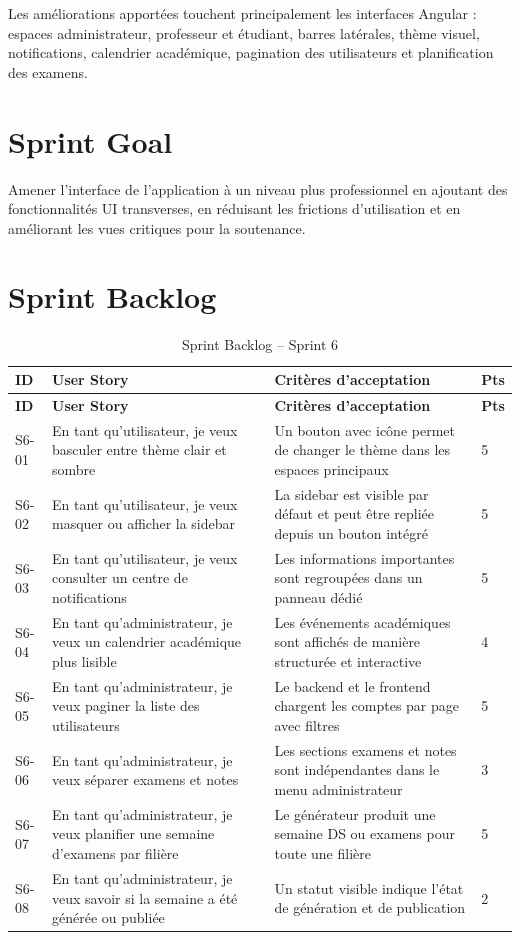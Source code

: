 \documentclass[12pt,a4paper]{report}
\begin{document}
Les améliorations apportées touchent principalement les interfaces Angular : espaces administrateur, professeur et étudiant, barres latérales, thème visuel, notifications, calendrier académique, pagination des utilisateurs et planification des examens.

\section{Sprint Goal}

Amener l'interface de l'application à un niveau plus professionnel en ajoutant des fonctionnalités UI transverses, en réduisant les frictions d'utilisation et en améliorant les vues critiques pour la soutenance.

\section{Sprint Backlog}

\begin{longtable}{|p{1.6cm}|p{6cm}|p{5.6cm}|p{1.4cm}|}
\caption{Sprint Backlog -- Sprint 6}\\
\hline
\textbf{ID} & \textbf{User Story} & \textbf{Critères d'acceptation} & \textbf{Pts} \\
\hline
\endfirsthead
\hline
\textbf{ID} & \textbf{User Story} & \textbf{Critères d'acceptation} & \textbf{Pts} \\
\hline
\endhead
S6-01 & En tant qu'utilisateur, je veux basculer entre thème clair et sombre & Un bouton avec icône permet de changer le thème dans les espaces principaux & 5 \\
\hline
S6-02 & En tant qu'utilisateur, je veux masquer ou afficher la sidebar & La sidebar est visible par défaut et peut être repliée depuis un bouton intégré & 5 \\
\hline
S6-03 & En tant qu'utilisateur, je veux consulter un centre de notifications & Les informations importantes sont regroupées dans un panneau dédié & 5 \\
\hline
S6-04 & En tant qu'administrateur, je veux un calendrier académique plus lisible & Les événements académiques sont affichés de manière structurée et interactive & 4 \\
\hline
S6-05 & En tant qu'administrateur, je veux paginer la liste des utilisateurs & Le backend et le frontend chargent les comptes par page avec filtres & 5 \\
\hline
S6-06 & En tant qu'administrateur, je veux séparer examens et notes & Les sections examens et notes sont indépendantes dans le menu administrateur & 3 \\
\hline
S6-07 & En tant qu'administrateur, je veux planifier une semaine d'examens par filière & Le générateur produit une semaine DS ou examens pour toute une filière & 5 \\
\hline
S6-08 & En tant qu'administrateur, je veux savoir si la semaine a été générée ou publiée & Un statut visible indique l'état de génération et de publication & 2 \\
\hline
\end{longtable}
\end{document}
